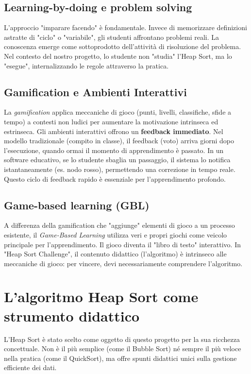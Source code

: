 \documentclass[openany]{theme/uniprthesis}
\begin{document}
\subsection{Learning-by-doing e problem solving}
L'approccio "imparare facendo" è fondamentale. Invece di memorizzare definizioni astratte di "ciclo" o "variabile", gli studenti affrontano problemi reali. La conoscenza emerge come sottoprodotto dell'attività di risoluzione del problema. Nel contesto del nostro progetto, lo studente non "studia" l'Heap Sort, ma lo "esegue", internalizzando le regole attraverso la pratica.

\subsection{Gamification e Ambienti Interattivi}
La \textit{gamification} applica meccaniche di gioco (punti, livelli, classifiche, sfide a tempo) a contesti non ludici per aumentare la motivazione intrinseca ed estrinseca. 
Gli ambienti interattivi offrono un \textbf{feedback immediato}. Nel modello tradizionale (compito in classe), il feedback (voto) arriva giorni dopo l'esecuzione, quando ormai il momento di apprendimento è passato. In un software educativo, se lo studente sbaglia un passaggio, il sistema lo notifica istantaneamente (es. nodo rosso), permettendo una correzione in tempo reale. Questo ciclo di feedback rapido è essenziale per l'apprendimento profondo.

\subsection{Game-based learning (GBL)}
A differenza della gamification che "aggiunge" elementi di gioco a un processo esistente, il \textit{Game-Based Learning} utilizza veri e propri giochi come veicolo principale per l'apprendimento. Il gioco diventa il "libro di testo" interattivo. In "Heap Sort Challenge", il contenuto didattico (l'algoritmo) è intrinseco alle meccaniche di gioco: per vincere, devi necessariamente comprendere l'algoritmo.

\section{L'algoritmo Heap Sort come strumento didattico}
L'Heap Sort è stato scelto come oggetto di questo progetto per la sua ricchezza concettuale. Non è il più semplice (come il Bubble Sort) né sempre il più veloce nella pratica (come il QuickSort), ma offre spunti didattici unici sulla gestione efficiente dei dati.
\end{document}
